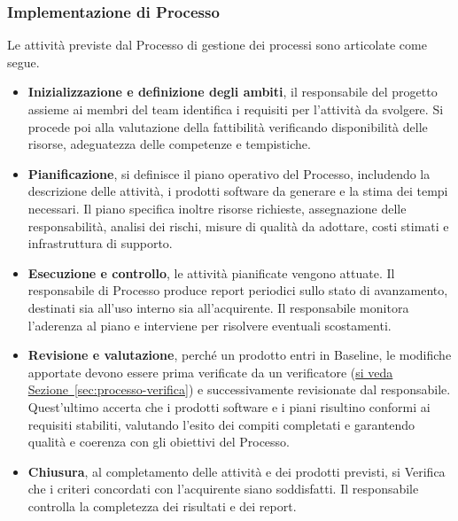 \documentclass[a4paper,12pt]{article}
\begin{document}
\subsubsection{Implementazione di Processo}
Le attività previste dal Processo di gestione dei processi sono articolate come segue.
\begin{itemize}
    \item \textbf{Inizializzazione e definizione degli ambiti}, il responsabile del progetto assieme ai membri del team identifica i requisiti per l'attività da svolgere. Si procede poi alla valutazione della fattibilità verificando disponibilità delle risorse, adeguatezza delle competenze e tempistiche.
    \item \textbf{Pianificazione}, si definisce il piano operativo del Processo, includendo la descrizione delle attività, i prodotti software da generare e la stima dei tempi necessari. Il piano specifica inoltre risorse richieste, assegnazione delle responsabilità, analisi dei rischi, misure di qualità da adottare, costi stimati e infrastruttura di supporto.
    \item \textbf{Esecuzione e controllo}, le attività pianificate vengono attuate. Il responsabile di Processo produce report periodici sullo stato di avanzamento, destinati sia all’uso interno sia all’acquirente. Il responsabile monitora l’aderenza al piano e interviene per risolvere eventuali scostamenti.
    \item \textbf{Revisione e valutazione}, perché un prodotto entri in Baseline, le modifiche apportate devono essere prima verificate da un verificatore (\hyperref[sec:processo-verifica]{si veda Sezione~\ref*{sec:processo-verifica}}) e successivamente revisionate dal responsabile. Quest’ultimo accerta che i prodotti software e i piani risultino conformi ai requisiti stabiliti, valutando l’esito dei compiti completati e garantendo qualità e coerenza con gli obiettivi del Processo.
    \item \textbf{Chiusura}, al completamento delle attività e dei prodotti previsti, si Verifica che i criteri concordati con l’acquirente siano soddisfatti. Il responsabile controlla la completezza dei risultati e dei report.
\end{itemize}
\end{document}
